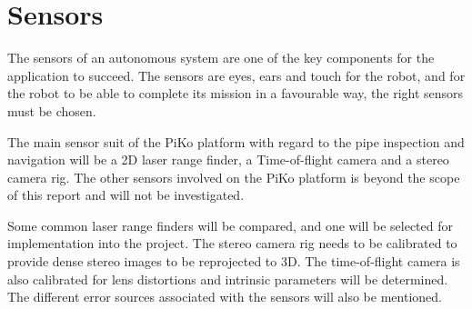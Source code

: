 

\chapter{Sensors}
\label{chap3}
The sensors of an autonomous system are one of the key components for the application to
succeed. The sensors are eyes, ears and touch for the robot, and for the robot to be able
to complete its mission in a favourable way, the right sensors must be chosen.

The main sensor suit of the PiKo platform with regard to the pipe inspection and
navigation will be a 2D laser range finder, a Time-of-flight camera and a stereo camera
rig. The other sensors involved on the PiKo platform is beyond the scope of this report
and will not be investigated. 

Some common laser range finders will be compared, and one will be selected for
implementation into the project. The stereo camera rig needs to be calibrated to provide
dense stereo images to be reprojected to 3D. The time-of-flight camera is also calibrated for lens
distortions and intrinsic parameters will be determined. The different error sources associated
with the sensors will also be mentioned.

